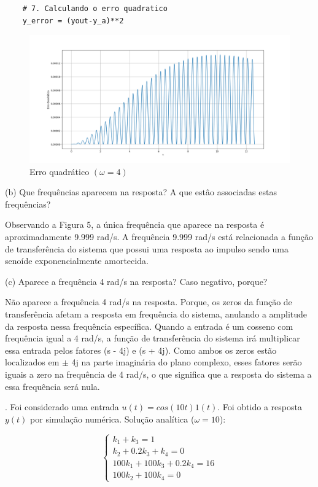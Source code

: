 \documentclass[10pt]{article}
\begin{document}
\begin{lstlisting}
    # 7. Calculando o erro quadratico
    y_error = (yout-y_a)**2
\end{lstlisting}

\newpage

\begin{figure}[h]
    \centering
    \includegraphics[scale=0.4]{erro2.png}
    \caption{Erro quadrático $(\omega = 4)$}
\end{figure}

(b) Que frequências aparecem na resposta? A que estâo associadas estas frequências?

\quad Observando a Figura 5, a única frequência que aparece na resposta é aproximadamente 9.999 rad/s.
A frequência 9.999 rad/s está relacionada a função de transferência do sistema
que possui uma resposta ao impulso sendo uma senoíde exponencialmente amortecida.

(c) Aparece a frequência 4 rad/s na resposta? Caso negativo, porque?

\quad Não aparece a frequência 4 rad/s na resposta. Porque, os zeros da função de transferência afetam a resposta em frequência do sistema,
anulando a amplitude da resposta nessa frequência específica.
Quando a entrada é um cosseno com frequência igual a 4 rad/s,
a função de transferência do sistema irá multiplicar essa entrada pelos fatores (s - 4j) e (s + 4j).
Como ambos os zeros estão localizados em $\pm$ 4j na parte imaginária do plano complexo,
esses fatores serão iguais a zero na frequência de 4 rad/s,
o que significa que a resposta do sistema a essa frequência será nula.

\newpage

. Foi considerado uma entrada $u(t) = cos(10 t) 1(t)$. Foi obtido a resposta $y(t)$ por simulação numérica. Solução analítica ($\omega = 10$):

\begin{equation}
    \left\{
    \begin{array}{l}
        k_1 + k_3 = 1 \\
        k_2 + 0.2k_3 +k_4 = 0 \\
        100k_1 + 100k_3 + 0.2k_4 = 16 \\
        100k_2 + 100k_4 = 0
    \end{array}
    \right. 
\end{equation}
\end{document}
